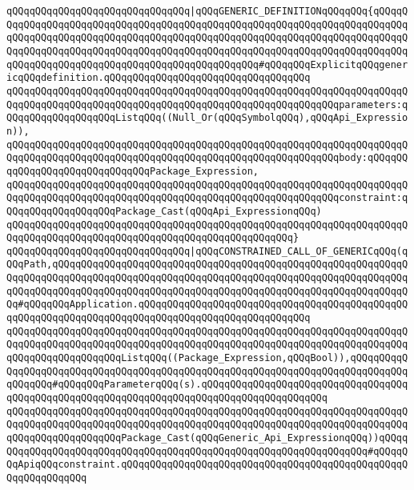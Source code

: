 \verb|qQQqqQQqqQQqqQQqqQQqqQQqqQQqqQQq|\verb#|qQQqGENERIC_DEFINITIONqQQqqQQq{qQQqqQQqqQQqqQQqqQQqqQQqqQQqqQQqqQQqqQQqqQQqqQQqqQQqqQQqqQQqqQQqqQQqqQQqqQQqqQQqqQQqqQQqqQQqqQQqqQQqqQQqqQQqqQQqqQQqqQQqqQQqqQQqqQQqqQQqqQQqqQQqqQQqqQQqqQQqqQQqqQQqqQQqqQQqqQQqqQQqqQQqqQQqqQQqqQQqqQQqqQQqqQQqqQQqqQQqqQQqqQQqqQQqqQQqqQQqqQQqqQQqqQQqqQQqqQQqqQQq#\verb|#qQQqqQQqExplicitqQQqgenericqQQqdefinition.qQQqqQQqqQQqqQQqqQQqqQQqqQQqqQQqqQQq|\newline
\verb|qQQqqQQqqQQqqQQqqQQqqQQqqQQqqQQqqQQqqQQqqQQqqQQqqQQqqQQqqQQqqQQqqQQqqQQqqQQqqQQqqQQqqQQqqQQqqQQqqQQqqQQqqQQqqQQqqQQqqQQqqQQqqQQqparameters:qQQqqQQqqQQqqQQqqQQqListqQQq((Null_Or(qQQqSymbolqQQq),qQQqApi_Expression)),|\newline
\verb|qQQqqQQqqQQqqQQqqQQqqQQqqQQqqQQqqQQqqQQqqQQqqQQqqQQqqQQqqQQqqQQqqQQqqQQqqQQqqQQqqQQqqQQqqQQqqQQqqQQqqQQqqQQqqQQqqQQqqQQqqQQqqQQqbody:qQQqqQQqqQQqqQQqqQQqqQQqqQQqqQQqPackage_Expression,|\newline
\verb|qQQqqQQqqQQqqQQqqQQqqQQqqQQqqQQqqQQqqQQqqQQqqQQqqQQqqQQqqQQqqQQqqQQqqQQqqQQqqQQqqQQqqQQqqQQqqQQqqQQqqQQqqQQqqQQqqQQqqQQqqQQqqQQqconstraint:qQQqqQQqqQQqqQQqqQQqPackage_Cast(qQQqApi_ExpressionqQQq)|\newline
\verb|qQQqqQQqqQQqqQQqqQQqqQQqqQQqqQQqqQQqqQQqqQQqqQQqqQQqqQQqqQQqqQQqqQQqqQQqqQQqqQQqqQQqqQQqqQQqqQQqqQQqqQQqqQQqqQQqqQQqqQQq}|\newline
\verb|qQQqqQQqqQQqqQQqqQQqqQQqqQQqqQQq|\verb#|qQQqCONSTRAINED_CALL_OF_GENERICqQQq(qQQqPath,qQQqqQQqqQQqqQQqqQQqqQQqqQQqqQQqqQQqqQQqqQQqqQQqqQQqqQQqqQQqqQQqqQQqqQQqqQQqqQQqqQQqqQQqqQQqqQQqqQQqqQQqqQQqqQQqqQQqqQQqqQQqqQQqqQQqqQQqqQQqqQQqqQQqqQQqqQQqqQQqqQQqqQQqqQQqqQQqqQQqqQQqqQQqqQQqqQQqqQQqqQQq#\verb|#qQQqqQQqApplication.qQQqqQQqqQQqqQQqqQQqqQQqqQQqqQQqqQQqqQQqqQQqqQQqqQQqqQQqqQQqqQQqqQQqqQQqqQQqqQQqqQQqqQQqqQQqqQQqqQQq|\newline
\verb|qQQqqQQqqQQqqQQqqQQqqQQqqQQqqQQqqQQqqQQqqQQqqQQqqQQqqQQqqQQqqQQqqQQqqQQqqQQqqQQqqQQqqQQqqQQqqQQqqQQqqQQqqQQqqQQqqQQqqQQqqQQqqQQqqQQqqQQqqQQqqQQqqQQqqQQqqQQqqQQqListqQQq((Package_Expression,qQQqBool)),qQQqqQQqqQQqqQQqqQQqqQQqqQQqqQQqqQQqqQQqqQQqqQQqqQQqqQQqqQQqqQQqqQQqqQQqqQQqqQQqqQQqqQQq#qQQqqQQqParameterqQQq(s).qQQqqQQqqQQqqQQqqQQqqQQqqQQqqQQqqQQqqQQqqQQqqQQqqQQqqQQqqQQqqQQqqQQqqQQqqQQqqQQqqQQqqQQqqQQq|\newline
\verb|qQQqqQQqqQQqqQQqqQQqqQQqqQQqqQQqqQQqqQQqqQQqqQQqqQQqqQQqqQQqqQQqqQQqqQQqqQQqqQQqqQQqqQQqqQQqqQQqqQQqqQQqqQQqqQQqqQQqqQQqqQQqqQQqqQQqqQQqqQQqqQQqqQQqqQQqqQQqqQQqPackage_Cast(qQQqGeneric_Api_ExpressionqQQq))qQQqqQQqqQQqqQQqqQQqqQQqqQQqqQQqqQQqqQQqqQQqqQQqqQQqqQQqqQQqqQQqqQQq#qQQqqQQqApiqQQqconstraint.qQQqqQQqqQQqqQQqqQQqqQQqqQQqqQQqqQQqqQQqqQQqqQQqqQQqqQQqqQQqqQQq|\newline
